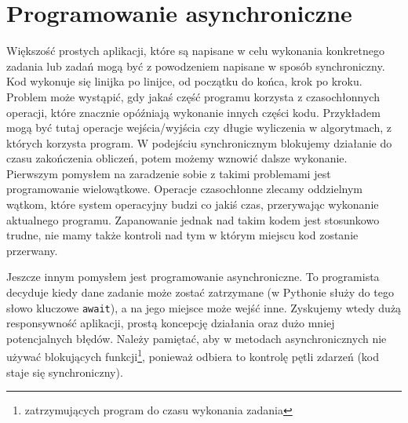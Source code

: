 \documentclass[shortabstract,inz]{iithesis}
\begin{document}
		\section{Programowanie asynchroniczne}
			Większość prostych aplikacji, które są napisane w celu wykonania konkretnego zadania lub zadań mogą być z powodzeniem napisane w sposób synchroniczny. Kod wykonuje się linijka po linijce, od początku do końca, krok po kroku. Problem może wystąpić, gdy jakaś część programu korzysta z czasochłonnych operacji, które znacznie opóźniają wykonanie innych części kodu. Przykładem mogą być tutaj operacje wejścia/wyjścia czy długie wyliczenia w algorytmach, z których korzysta program. W podejściu synchronicznym blokujemy działanie do czasu zakończenia obliczeń, potem możemy wznowić dalsze wykonanie. Pierwszym pomysłem na zaradzenie sobie z takimi problemami jest programowanie wielowątkowe. Operacje czasochłonne zlecamy oddzielnym wątkom, które system operacyjny budzi co jakiś czas, przerywając wykonanie aktualnego programu. Zapanowanie jednak nad takim kodem jest stosunkowo trudne, nie mamy także kontroli nad tym w którym miejscu kod zostanie przerwany.
		
			Jeszcze innym pomysłem jest programowanie asynchroniczne. To programista decyduje kiedy dane zadanie może zostać zatrzymane (w Pythonie służy do tego słowo kluczowe \texttt{await}), a na jego miejsce może wejść inne. Zyskujemy wtedy dużą responsywność aplikacji, prostą koncepcję działania oraz dużo mniej potencjalnych błędów. Należy pamiętać, aby w metodach asynchronicznych nie używać blokujących funkcji\footnote{zatrzymujących program do czasu wykonania zadania}, ponieważ odbiera to kontrolę pętli zdarzeń (kod staje się synchroniczny).
		
\end{document}
